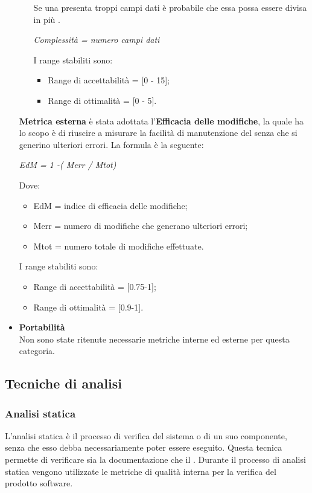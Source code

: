 \begin{itemize}
\begin{itemize}
          Se una  presenta troppi campi dati è probabile che essa possa essere divisa in più .
            \begin{center}
              \emph{Complessità  = numero campi dati}
            \end{center}
            I range stabiliti sono:
            \begin{itemize}
              \item Range di accettabilità = [0 - 15];
              \item Range di ottimalità = [0 - 5].
            \end{itemize}
        \end{itemize}
        \textbf{Metrica esterna} è stata adottata l'\textbf{Efficacia delle modifiche},
        la quale ha lo scopo è di riuscire a misurare la facilità di manutenzione del  senza che si generino ulteriori errori.
        La formula è la seguente:
        \begin{center}
          \emph{EdM = 1 -( Merr / Mtot)}
        \end{center}
        Dove:
        \begin{itemize}
          \item EdM = indice di efficacia delle modifiche;
          \item Merr = numero di modifiche che generano ulteriori errori;
          \item Mtot = numero totale di modifiche effettuate.
        \end{itemize}
        I range stabiliti sono:
        \begin{itemize}
          \item Range di accettabilità = [0.75-1];
          \item Range di ottimalità = [0.9-1].
        \end{itemize}
      \item \textbf{Portabilità}\\
      Non sono state ritenute necessarie metriche interne ed esterne per questa categoria.
    \end{itemize}



  \subsection{Tecniche di analisi}
    \subsubsection{Analisi statica}
    L'analisi statica è il processo di verifica del sistema o di un suo componente, senza che esso debba necessariamente poter essere eseguito.
    Questa tecnica permette di verificare sia la documentazione che il .
    Durante il processo di analisi statica vengono utilizzate le metriche di qualità interna per la verifica del prodotto software.
